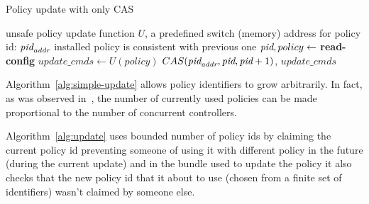 \documentclass[conference]{sigcomm-alternate}
\newcommand{\hide}[1]{}
\newcommand{\addr}{\emph{addr}\xspace}
\newcommand{\pid}{\emph{pid}\xspace}
\newcommand{\ufunc}{U} %
\begin{document}
\begin{algorithm}[h]
    \caption{Policy update with only CAS}
    \label{alg:simple-update}
    \begin{algorithmic}[1]
    \Require unsafe policy update function $\ufunc$, a predefined switch (memory) address for policy id: $\pid_{\addr}$
    \Ensure installed policy is consistent with previous one
 		\Repeat
 			\State $\pid,policy\gets$ \textbf{read-config} %
 			\State $update\_cmds\gets \ufunc(policy)$
 			\startTxn
	 			\State $CAS(\pid_{\addr},\pid,\pid+1)$,
	 			\State $update\_cmds$ %
 			\endTxn
			\Return

    \end{algorithmic}
\end{algorithm}


Algorithm~\ref{alg:simple-update} allows policy identifiers to grow
arbitrarily. In fact, as was observed in~\cite{cpc}, the number of currently
used policies can be made proportional to the number of concurrent
controllers.


\hide{
It takes a set of rules $U$ (not yet a policy)and proceeds as follows: first, we seek to
 obtain a unique \emph{id}. FIXME: to be continued...
 \textbf{LS: I am not sure if I need to tell every step of the story or maybe it best to explain the main dif from the previous one similarly to what I just wrote next}.
}

Algorithm~\ref{alg:update} uses bounded number of policy ids by claiming the current policy id preventing someone of using it with different policy in the future (during the current update) and in the bundle used to update the policy it also checks that the new policy id that it about to use (chosen from a finite set of identifiers) wasn't claimed by someone else.

\hide{
We compute our new suggested policy by applying the update requests on top of current policy, supporting any kind of requests and policies. Then we make a transaction (using the bundle feature) to atomically check that our policy id is not blocked by anyone else, to change the current policy id to ours (an action that would fail if the current policy id is no longer what we are counting of) and to actually configure our new policy.

If one of the actions in the transaction fails we try again. There is no progress guaranty for each controller but there is one for the whole system - at least one of the controller will succeed in fulfilling its update requirements.
}
\end{document}
